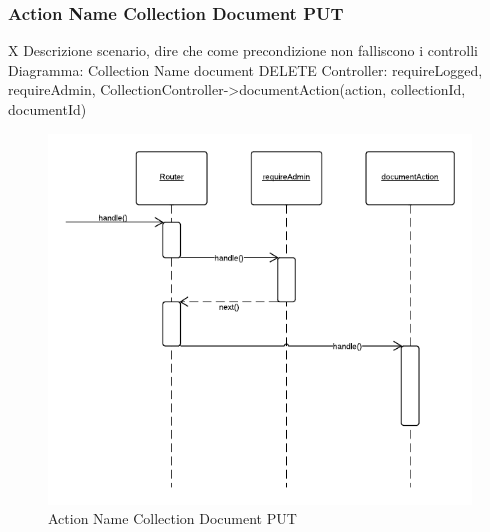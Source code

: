 \subsubsection{Action Name Collection Document PUT} X
Descrizione scenario, dire che come precondizione non falliscono i controlli
Diagramma: Collection Name document DELETE
Controller: requireLogged, requireAdmin, CollectionController->documentAction(action, collectionId, documentId)
\begin{figure}[H]
	\begin{center} 
		\includegraphics[scale=0.60]{scenari/Action Name Collection Document PUT.png} 
		\caption{Action Name Collection Document PUT}
	\end{center} 
\end{figure}

